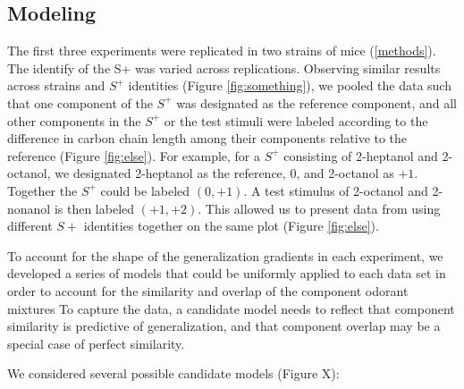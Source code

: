 \subsection{Modeling}
\label{results_models}
The first three experiments were replicated in two strains of mice (\ref{methods}). The identify of the S+ was varied across replications.  Observing similar results across strains and $S^+$ identities (Figure \ref{fig:something}), we pooled the data such that one component of the $S^+$ was designated as the reference component, and all other components in the $S^+$ or the test stimuli were labeled according to the difference in carbon chain length among their components relative to the reference (Figure \ref{fig:else}).  For example, for a $S^+$ consisting of 2-heptanol and 2-octanol, we designated 2-heptanol as the reference, $0$, and 2-octanol as $+1$.  Together the $S^+$ could be labeled $(0,+1)$.  A test stimulus of 2-octanol and 2-nonanol is then labeled $(+1,+2)$.  This allowed us to present data from using different $S+$ identities together on the same plot (Figure \ref{fig:else}).  

To account for the shape of the generalization gradients in each experiment, we developed a series of models that could be uniformly applied to each data set in order to account for  the similarity and overlap of the component odorant mixtures  To capture the data, a candidate model needs to reflect that component similarity is predictive of generalization, and that component overlap may be a special case of perfect similarity.  

We considered several possible candidate models (Figure X):